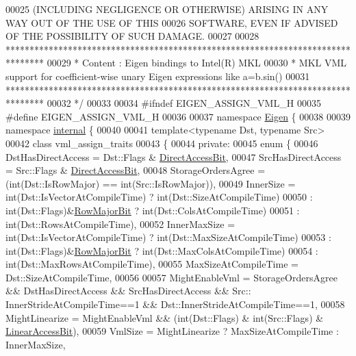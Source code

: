 \begin{DoxyCode}
00025 \textcolor{comment}{ (INCLUDING NEGLIGENCE OR OTHERWISE) ARISING IN ANY WAY OUT OF THE USE OF THIS}
00026 \textcolor{comment}{ SOFTWARE, EVEN IF ADVISED OF THE POSSIBILITY OF SUCH DAMAGE.}
00027 \textcolor{comment}{}
00028 \textcolor{comment}{ ********************************************************************************}
00029 \textcolor{comment}{ *   Content : Eigen bindings to Intel(R) MKL}
00030 \textcolor{comment}{ *   MKL VML support for coefficient-wise unary Eigen expressions like a=b.sin()}
00031 \textcolor{comment}{ ********************************************************************************}
00032 \textcolor{comment}{*/}
00033 
00034 \textcolor{preprocessor}{#ifndef EIGEN\_ASSIGN\_VML\_H}
00035 \textcolor{preprocessor}{#define EIGEN\_ASSIGN\_VML\_H}
00036 
00037 \textcolor{keyword}{namespace }\hyperlink{namespace_eigen}{Eigen} \{ 
00038 
00039 \textcolor{keyword}{namespace }\hyperlink{namespaceinternal}{internal} \{
00040 
00041 \textcolor{keyword}{template}<\textcolor{keyword}{typename} Dst, \textcolor{keyword}{typename} Src>
00042 \textcolor{keyword}{class }vml\_assign\_traits
00043 \{
00044   \textcolor{keyword}{private}:
00045     \textcolor{keyword}{enum} \{
00046       DstHasDirectAccess = Dst::Flags & \hyperlink{group__flags_gabf1e9d0516a933445a4c307ad8f14915}{DirectAccessBit},
00047       SrcHasDirectAccess = Src::Flags & \hyperlink{group__flags_gabf1e9d0516a933445a4c307ad8f14915}{DirectAccessBit},
00048       StorageOrdersAgree = (int(Dst::IsRowMajor) == int(Src::IsRowMajor)),
00049       InnerSize = \textcolor{keywordtype}{int}(Dst::IsVectorAtCompileTime) ? int(Dst::SizeAtCompileTime)
00050                 : int(Dst::Flags)&\hyperlink{group__flags_gae4f56c2a60bbe4bd2e44c5b19cbe8762}{RowMajorBit} ? int(Dst::ColsAtCompileTime)
00051                 : int(Dst::RowsAtCompileTime),
00052       InnerMaxSize  = int(Dst::IsVectorAtCompileTime) ? int(Dst::MaxSizeAtCompileTime)
00053                     : int(Dst::Flags)&\hyperlink{group__flags_gae4f56c2a60bbe4bd2e44c5b19cbe8762}{RowMajorBit} ? int(Dst::MaxColsAtCompileTime)
00054                     : int(Dst::MaxRowsAtCompileTime),
00055       MaxSizeAtCompileTime = Dst::SizeAtCompileTime,
00056 
00057       MightEnableVml = StorageOrdersAgree && DstHasDirectAccess && SrcHasDirectAccess && Src::
      InnerStrideAtCompileTime==1 && Dst::InnerStrideAtCompileTime==1,
00058       MightLinearize = MightEnableVml && (int(Dst::Flags) & int(Src::Flags) & 
      \hyperlink{group__flags_ga4b983a15d57cd55806df618ac544d09e}{LinearAccessBit}),
00059       VmlSize = MightLinearize ? MaxSizeAtCompileTime : InnerMaxSize,

\end{DoxyCode}
